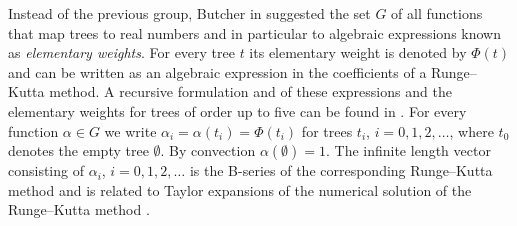 Instead of the previous group, Butcher in \cite{Butcher1972} suggested the set $G$ of all functions that map trees to real numbers and in particular to algebraic expressions known as \emph{elementary weights}.
For every tree $t$ its elementary weight is denoted by $\Phi(t)$ and can be written as an algebraic expression in the coefficients of a Runge--Kutta method.  A recursive formulation and of these expressions and the elementary weights for trees of order up to five can be found in \cite[Definition and Tables~3.12]{Butcher2008_book}.
For every function $\alpha \in G$ we write $\alpha_{i} = \alpha(t_{i}) = \Phi(t_{i})$ for trees $t_{i}$, $i = 0, 1, 2, \dots$, where $t_{0}$ denotes the empty tree $\emptyset$. By convection $\alpha(\emptyset) = 1$. The infinite length vector consisting of $\alpha_i$, $i = 0, 1, 2, \ldots$ is the B-series of the corresponding Runge--Kutta method and is related to Taylor expansions of the numerical solution of the Runge--Kutta method \cite{Hairer1974, Butcher2008_book}.

